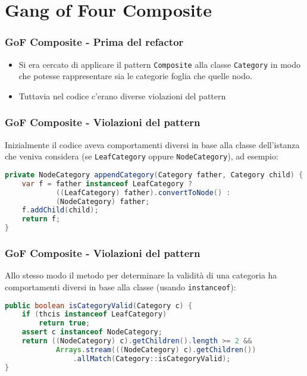 \section{Gang of Four Composite}
\begin{frame}
    \frametitle{GoF Composite - Prima del refactor}

    \begin{minipage}{.5\textwidth}
        \begin{figure}
            \centering
        \end{figure}
    \end{minipage}
    \begin{minipage}{.49\textwidth}
        \begin{itemize}
            \item<1-> Si era cercato di applicare il pattern \texttt{Composite} alla classe \texttt{Category} in modo che potesse rappresentare sia le categorie foglia che quelle nodo.
            \item<2-> Tuttavia nel codice c'erano diverse violazioni del pattern
        \end{itemize}
    \end{minipage}

\end{frame}

\begin{frame}[fragile]
    \frametitle{GoF Composite - Violazioni del pattern}

    Inizialmente il codice aveva comportamenti diversi in base alla classe dell'istanza che veniva considera (se \texttt{LeafCategory} oppure \texttt{NodeCategory}), ad esempio:

    \lstset{style=java}
    \begin{lstlisting}[language=java, caption={v5 commit 34c1a67}]
private NodeCategory appendCategory(Category father, Category child) {
    var f = father instanceof LeafCategory ?
            ((LeafCategory) father).convertToNode() : 
            (NodeCategory) father;
    f.addChild(child);
    return f;
}
    \end{lstlisting}

\end{frame}

\begin{frame}[fragile]
    \frametitle{GoF Composite - Violazioni del pattern}

    Allo stesso modo il metodo per determinare la validità di una categoria ha comportamenti diversi in base alla classe (usando \texttt{instanceof}):

    \lstset{style=java}
    \begin{lstlisting}[language=java, caption={v5 commit 34c1a67}]
public boolean isCategoryValid(Category c) {
    if (thcis instanceof LeafCategory)
        return true;
    assert c instanceof NodeCategory;
    return ((NodeCategory) c).getChildren().length >= 2 &&
            Arrays.stream(((NodeCategory) c).getChildren())
                .allMatch(Category::isCategoryValid);
}
    \end{lstlisting}

\end{frame}

